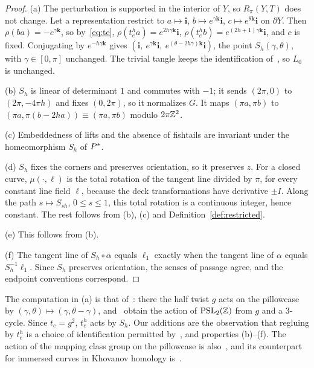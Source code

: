 \begin{proof}
(a) The perturbation is supported in the interior of $Y$, so $R_\pi(Y,T)$ does not change. Let a representation
restrict to $a\mapsto\mathbf i$, $b\mapsto e^{\gamma\mathbf k}\mathbf i$, $c\mapsto e^{\theta\mathbf k}\mathbf i$ on $\partial Y$. Then
$\rho(ba)=-e^{\gamma\mathbf k}$, so by~\eqref{eq:te}, $\rho(t_e^ha)=e^{2h\gamma\mathbf k}\mathbf i$, $\rho(t_e^hb)=e^{(2h+1)\gamma\mathbf k}\mathbf i$,
and $c$ is fixed. Conjugating by $e^{-h\gamma\mathbf k}$ gives $(\mathbf i,\ e^{\gamma\mathbf k}\mathbf i,\ e^{(\theta-2h\gamma)\mathbf k}\mathbf i)$, the
point $S_h(\gamma,\theta)$, with $\gamma\in[0,\pi]$ unchanged. The trivial tangle keeps the identification
of~\cite[(17)]{HHK2}, so $L_0$ is unchanged.

(b) $S_h$ is linear of determinant $1$ and commutes with $-1$; it sends $(2\pi,0)$ to $(2\pi,-4\pi h)$ and fixes
$(0,2\pi)$, so it normalizes $G$. It maps $(\pi a,\pi b)$ to $(\pi a,\pi(b-2ha))\equiv(\pi a,\pi b)$ modulo $2\pi\mathbb{Z}^2$.

(c) Embeddedness of lifts and the absence of fishtails are invariant under the homeomorphism $S_h$ of $P^{*}$.

(d) $S_h$ fixes the corners and preserves orientation, so it preserves $z$. For a closed curve, $\mu(\cdot,\ell)$ is
the total rotation of the tangent line divided by $\pi$, for every constant line field $\ell$, because the deck
transformations have derivative $\pm I$. Along the path $s\mapsto S_{sh}$, $0\le s\le1$, this total rotation is a
continuous integer, hence constant. The rest follows from (b), (c) and Definition~\ref{def:restricted}.

(e) This follows from (b).

(f) The tangent line of $S_h\circ\alpha$ equals $\ell_1$ exactly when the tangent line of $\alpha$ equals $S_h^{-1}\ell_1$. Since
$S_h$ preserves orientation, the senses of passage agree, and the endpoint conventions correspond.
\end{proof}

The computation in (a) is that of~\cite[(28)]{HHK2}: there the half twist $g$ acts on the pillowcase by
$(\gamma,\theta)\mapsto(\gamma,\theta-\gamma)$, and~\cite[(29)--(30)]{HHK2} obtain the action of $\mathrm{PSL}_2(\mathbb{Z})$ from $g$ and a
$3$-cycle. Since $t_e=g^2$, $t_e^h$ acts by $S_h$. Our additions are the observation that regluing by $t_e^h$ is a
choice of identification permitted by~\cite[(17)]{HHK2}, and properties (b)--(f). The action of the mapping class
group on the pillowcase is also~\cite[Thm.~B]{CHK}, and its counterpart for immersed curves in Khovanov
homology is~\cite[Thm.~8.1]{KWZ}.

